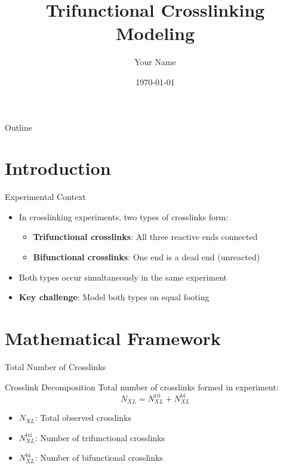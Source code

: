 \documentclass{beamer}
\title{Trifunctional Crosslinking Modeling}
\author{Your Name}
\institute{Your Institution}
\date{\today}
\begin{document}
\begin{frame}
\titlepage
\end{frame}

\begin{frame}{Outline}
\tableofcontents
\end{frame}

\section{Introduction}

\begin{frame}{Experimental Context}
\begin{itemize}
    \item<1-> In crosslinking experiments, two types of crosslinks form:
    \begin{itemize}
        \item \textbf{Trifunctional crosslinks}: All three reactive ends connected
        \item \textbf{Bifunctional crosslinks}: One end is a dead end (unreacted)
    \end{itemize}
    
    \vspace{0.5cm}
    
    \item<2-> Both types occur simultaneously in the same experiment
    
    \item<3-> \textbf{Key challenge}: Model both types on equal footing
\end{itemize}

\end{frame}

\section{Mathematical Framework}

\begin{frame}{Total Number of Crosslinks}
\begin{block}{Crosslink Decomposition}
Total number of crosslinks formed in experiment:
\begin{equation}
    N_{XL} = N^{\text{tri}}_{XL} + N^{\text{bi}}_{XL}
\end{equation}
\end{block}

\vspace{0.5cm}

\begin{itemize}
    \item $N_{XL}$: Total observed crosslinks
    \item $N^{\text{tri}}_{XL}$: Number of trifunctional crosslinks
    \item $N^{\text{bi}}_{XL}$: Number of bifunctional crosslinks
\end{itemize}
\end{frame}
\end{document}

